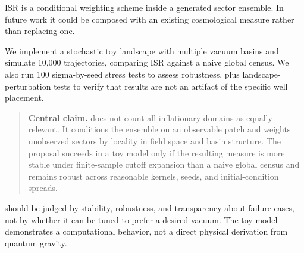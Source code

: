 ISR is a conditional weighting scheme inside a generated sector ensemble.
In future work it could be composed with an existing cosmological measure
rather than replacing one.

We implement a stochastic toy landscape with multiple vacuum basins and
simulate 10,000 trajectories, comparing ISR against a naive global census.
We also run 100 sigma-by-seed stress tests to assess robustness, plus
landscape-perturbation tests to verify that results are not an artifact of
the specific well placement.

\begin{quote}
\textbf{Central claim.}
\ISR does not count all inflationary domains as equally relevant.
It conditions the ensemble on an observable patch and weights unobserved sectors
by locality in field space and basin structure.
The proposal succeeds in a toy model only if the resulting measure is more
stable under finite-sample cutoff expansion than a naive global census and
remains robust across reasonable kernels, seeds, and initial-condition spreads.
\end{quote}

\ISR should be judged by stability, robustness, and transparency about
failure cases, not by whether it can be tuned to prefer a desired vacuum.
The toy model demonstrates a computational behavior, not a direct physical
derivation from quantum gravity.
